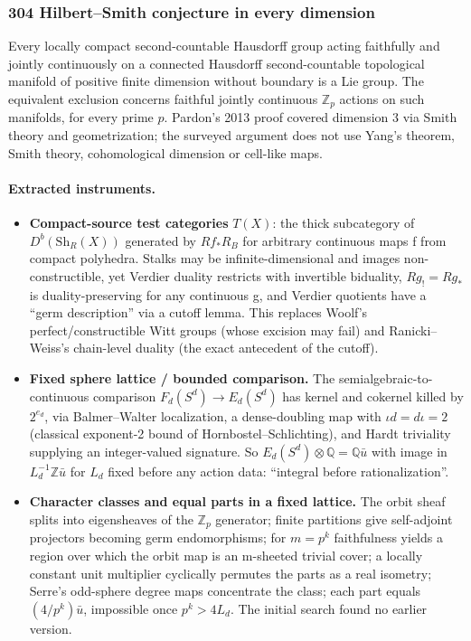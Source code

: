 \documentclass[11pt]{article}
\providecommand{\gt}{>}
\newcommand{\badges}[1]{\par\noindent{\small\sffamily\color{black!70}#1}\par\smallskip}
\newcommand{\badgesep}{\textbar}
\begin{document}
\subsubsection{\texorpdfstring{304 \textperiodcentered{} Hilbert--Smith conjecture in every dimension}{304 · Hilbert–Smith conjecture in every dimension}}\label{fam:304}
\badges{not formalized \badgesep{} new}

Every locally compact second-countable Hausdorff group acting faithfully and jointly continuously on a connected Hausdorff second-countable topological manifold of positive finite dimension without boundary is a Lie group. The equivalent exclusion concerns faithful jointly continuous $\mathbb{Z}_p$ actions on such manifolds, for every prime $p$. Pardon's 2013 proof covered dimension 3 via Smith theory and geometrization; the surveyed argument does not use Yang's theorem, Smith theory, cohomological dimension or cell-like maps.

\paragraph{Extracted instruments.}

\begin{itemize}
\item \textbf{Compact-source test categories} $T(X)$: the thick subcategory of $D^b(\mathrm{Sh}_R(X))$ generated by $Rf_*R_B$ for arbitrary continuous maps f from compact polyhedra. Stalks may be infinite-dimensional and images non-constructible, yet Verdier duality restricts with invertible biduality, $Rg_!=Rg_*$ is duality-preserving for any continuous g, and Verdier quotients have a ``germ description'' via a cutoff lemma. This replaces Woolf's perfect/constructible Witt groups (whose excision may fail) and Ranicki--Weiss's chain-level duality (the exact antecedent of the cutoff).
\item \textbf{Fixed sphere lattice / bounded comparison.} The semialgebraic-to-continuous comparison $F_d(S^d)\to E_d(S^d)$ has kernel and cokernel killed by $2^{e_d}$, via Balmer--Walter localization, a dense-doubling map with $\iota d=d\iota=2$ (classical exponent-2 bound of Hornbostel--Schlichting), and Hardt triviality supplying an integer-valued signature. So $E_d(S^d)\otimes\mathbb Q=\mathbb Q\bar u$ with image in $L_d^{-1}\mathbb Z\bar u$ for $L_d$ fixed before any action data: ``integral before rationalization''.
\item \textbf{Character classes and equal parts in a fixed lattice.} The orbit sheaf splits into eigensheaves of the $\mathbb{Z}_p$ generator; finite partitions give self-adjoint projectors becoming germ endomorphisms; for $m=p^k$ faithfulness yields a region over which the orbit map is an m-sheeted trivial cover; a locally constant unit multiplier cyclically permutes the parts as a real isometry; Serre's odd-sphere degree maps concentrate the class; each part equals $(4/p^k)\bar u$, impossible once $p^k\gt4L_d$. The initial search found no earlier version.
\end{itemize}
\end{document}
